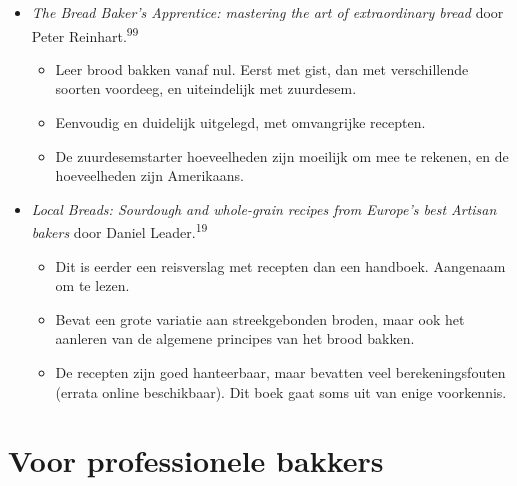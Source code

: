 \documentclass[
  11pt,
  dutch,
]{memoir}
\providecommand{\tightlist}{%
  \setlength{\itemsep}{0pt}\setlength{\parskip}{0pt}}
\begin{document}
\begin{itemize}
\tightlist
\item
  \emph{The Bread Baker's Apprentice: mastering the art of extraordinary
  bread} door Peter Reinhart.\textsuperscript{99}

  \begin{itemize}
  \tightlist
  \item
    Leer brood bakken vanaf nul. Eerst met gist, dan met verschillende
    soorten voordeeg, en uiteindelijk met zuurdesem.
  \item
    Eenvoudig en duidelijk uitgelegd, met omvangrijke recepten.
  \item
    De zuurdesemstarter hoeveelheden zijn moeilijk om mee te rekenen, en
    de hoeveelheden zijn Amerikaans.
  \end{itemize}
\item
  \emph{Local Breads: Sourdough and whole-grain recipes from Europe's
  best Artisan bakers} door Daniel Leader.\textsuperscript{19}

  \begin{itemize}
  \tightlist
  \item
    Dit is eerder een reisverslag met recepten dan een handboek.
    Aangenaam om te lezen.
  \item
    Bevat een grote variatie aan streekgebonden broden, maar ook het
    aanleren van de algemene principes van het brood bakken.
  \item
    De recepten zijn goed hanteerbaar, maar bevatten veel
    berekeningsfouten (errata online beschikbaar). Dit boek gaat soms
    uit van enige voorkennis.
  \end{itemize}
\end{itemize}

\hypertarget{voor-professionele-bakkers}{%
\section{Voor professionele bakkers}\label{voor-professionele-bakkers}}
\end{document}
